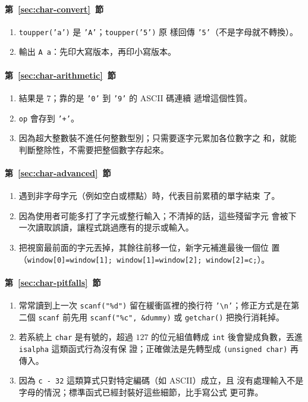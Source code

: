 \paragraph{第~\ref{sec:char-convert}~節}
\begin{enumerate}
\item \texttt{toupper('a')} 是 \texttt{'A'}；\texttt{toupper('5')} 原
樣回傳 \texttt{'5'}（不是字母就不轉換）。
\item 輸出 \texttt{A a}：先印大寫版本，再印小寫版本。
\end{enumerate}

\paragraph{第~\ref{sec:char-arithmetic}~節}
\begin{enumerate}
\item 結果是 $7$；靠的是 \texttt{'0'} 到 \texttt{'9'} 的 ASCII 碼連續
遞增這個性質。
\item \texttt{op} 會存到 \texttt{'+'}。
\item 因為超大整數裝不進任何整數型別；只需要逐字元累加各位數字之
和，就能判斷整除性，不需要把整個數字存起來。
\end{enumerate}

\paragraph{第~\ref{sec:char-advanced}~節}
\begin{enumerate}
\item 遇到非字母字元（例如空白或標點）時，代表目前累積的單字結束
了。
\item 因為使用者可能多打了字元或整行輸入；不清掉的話，這些殘留字元
會被下一次讀取誤讀，讓程式跳過應有的提示或輸入。
\item 把視窗最前面的字元丟掉，其餘往前移一位，新字元補進最後一個位
置（\texttt{window[0]=window[1]; window[1]=window[2]; window[2]=c;}）。
\end{enumerate}

\paragraph{第~\ref{sec:char-pitfalls}~節}
\begin{enumerate}
\item 常常讀到上一次 \texttt{scanf("\%d")} 留在緩衝區裡的換行符
\texttt{'\textbackslash n'}；修正方式是在第二個 \texttt{scanf} 前先用
\texttt{scanf("\%c", \&dummy)} 或 \texttt{getchar()} 把換行消耗掉。
\item 若系統上 \texttt{char} 是有號的，超過 $127$ 的位元組值轉成
\texttt{int} 後會變成負數，丟進 \texttt{isalpha} 這類函式行為沒有保
證；正確做法是先轉型成 \texttt{(unsigned char)} 再傳入。
\item 因為 \texttt{c - 32} 這類算式只對特定編碼（如 ASCII）成立，且
沒有處理輸入不是字母的情況；標準函式已經封裝好這些細節，比手寫公式
更可靠。
\end{enumerate}
